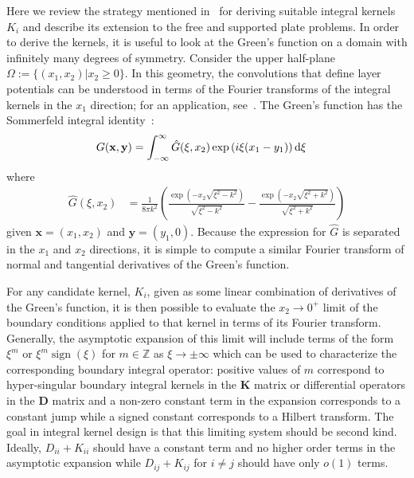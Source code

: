 \documentclass[preprint,12pt,3p]{elsarticle}
\newcommand{\dd}{ {\rm d} }
\DeclareMathOperator{\sign}{sign}
\begin{document}
    Here we review the strategy  mentioned in~\cite{farkas}  for deriving suitable integral kernels $K_i$ and
    describe its extension to the free and supported plate problems. In order to derive the kernels, it is useful to look at the Green's function on a domain with infinitely many degrees of symmetry. Consider the upper half-plane $\Omega := \{ (x_1,x_2) | x_2 \geq 0 \}$. In this geometry, the convolutions
    that define layer potentials can be understood in terms of the Fourier transforms of the 
    integral kernels in the $x_1$ direction; for an application, see~\cite{oneil2014efficient}. 
    The Green's function has the Sommerfeld integral identity~\cite{sommerfeld1949partial}:  
    \begin{align}   G(\mathbf{x},\mathbf{y}) &= \int^{\infty}_{-\infty      }  \hat{G}(\xi,x_2) \exp{(i\xi (x_1 - y_1 ))} \, \dd \xi \label{sommerfeld} 
\end{align}
where
\begin{align}
    \hat{G}(\xi,x_2) &= \frac{1}{8 \pi k^2}  \left ( \frac{\exp{(- x_2 \sqrt{\xi^2 - k^2}) }}{\sqrt{\xi^2 - k^2}} - \frac{\exp{(-x_2 \sqrt{\xi^2 + k^2 }) }}{\sqrt{\xi^2 + k^2}} \right )
\end{align}
given $\mathbf{x} = (x_1,x_2)$ and $\mathbf{y}=(y_1,0)$. Because the expression for $\hat{G}$ is separated in the $x_1$ and $x_2$ directions,
it is simple to compute a similar Fourier transform of normal and tangential derivatives of the Green's function.

For any candidate kernel, $K_i$, given as some linear combination of derivatives of the Green's function, it is then possible 
to evaluate the $x_2\to 0^+$ limit of the boundary conditions applied to that kernel in terms of its 
Fourier transform.
Generally, the asymptotic expansion of this limit will include terms of the form $\xi^m$ or $\xi^m \sign(\xi)$ for $m \in \mathbb{Z}$ as 
$\xi \rightarrow \pm \infty$ which can be used to characterize the corresponding boundary integral operator: 
positive values of $m$ correspond to hyper-singular boundary integral kernels in the $\mathbf{K}$ matrix or differential operators
in the $\mathbf{D}$ matrix and a non-zero constant term in the expansion corresponds to a constant 
jump while a signed constant corresponds to a Hilbert transform. The goal in integral kernel design is that this limiting
system should be second kind. Ideally, $D_{ii}+K_{ii}$ should have a constant
term and no higher order terms in the asymptotic expansion while $D_{ij}+K_{ij}$
for $i\ne j$ should have only $o(1)$ terms. 
\end{document}
